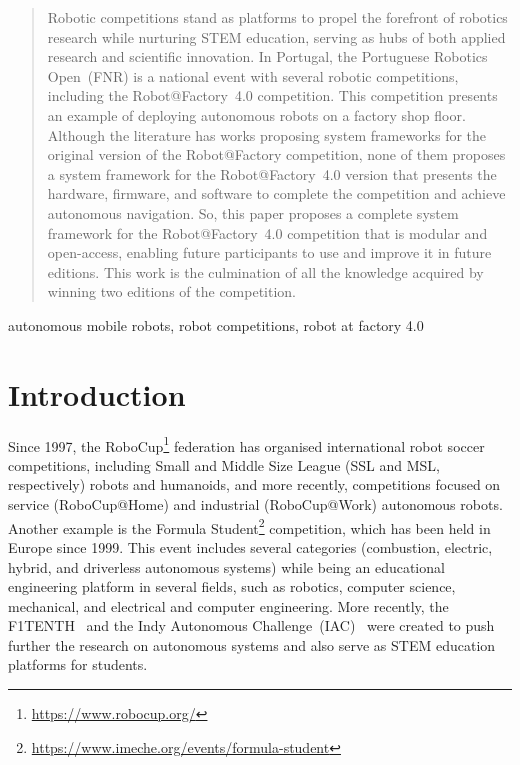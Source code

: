 \documentclass[conference]{IEEEtran}
\begin{document}
\maketitle






\begin{abstract}
Robotic competitions stand as platforms to propel the forefront of robotics research while nurturing STEM education, serving as hubs of both applied research and scientific innovation.
In Portugal, the Portuguese Robotics Open~(FNR) is a national event with several robotic competitions, including the Robot@Factory~4.0 competition.
This competition presents an example of deploying autonomous robots on a factory shop floor.
Although the literature has works proposing system frameworks for the original version of the Robot@Factory competition, none of them proposes a system framework for the Robot@Factory~4.0 version that presents the hardware, firmware, and software to complete the competition and achieve autonomous navigation.
So, this paper proposes a complete system framework for the Robot@Factory~4.0 competition that is modular and open-access, enabling future participants to use and improve it in future editions.
This work is the culmination of all the knowledge acquired by winning two editions of the competition.
\end{abstract}

\begin{IEEEkeywords}
autonomous mobile robots, robot competitions, robot at factory 4.0
\end{IEEEkeywords}






\section{Introduction}\label{sec:intro}

Since 1997, the RoboCup\footnote{\label{note:robocup}\url{https://www.robocup.org/}} federation has organised international robot soccer competitions, including Small and Middle Size League (SSL and MSL, respectively) robots and humanoids, and more recently, competitions focused on service (RoboCup@Home) and industrial (RoboCup@Work) autonomous robots.
Another example is the Formula Student\footnote{\url{https://www.imeche.org/events/formula-student}} competition, which has been held in Europe since 1999. This event includes several categories (combustion, electric, hybrid, and driverless autonomous systems) while being an educational engineering platform in several fields, such as robotics, computer science, mechanical, and electrical and computer engineering.
More recently, the F1TENTH~\cite{literature:competitions:f1tenth} and the Indy Autonomous Challenge~(IAC)~\cite{literature:competitions:indy} were created to push further the research on autonomous systems and also serve as STEM education platforms for students.
\end{document}
